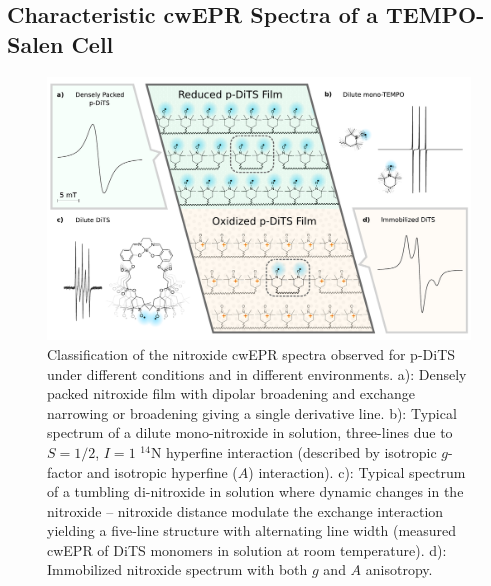 \subsection{Characteristic cwEPR Spectra of a TEMPO-Salen Cell}
\label{Classification}
\begin{figure}[H]
\center
	\includegraphics[width=1\textwidth]{./operando_epr/figures/Cartoon_ALL.pdf}
	\caption{Classification of the nitroxide cwEPR spectra observed for p-DiTS under different conditions and in different environments. a): Densely packed nitroxide film with dipolar broadening and exchange narrowing or broadening giving a single derivative line. b): Typical spectrum of a dilute mono-nitroxide in solution, three-lines due to $S=1/2$, $I=1$ $^{14}$N hyperfine interaction (described by isotropic $g$-factor and isotropic hyperfine ($A$) interaction). c): Typical spectrum of a tumbling di-nitroxide in solution where dynamic changes in the nitroxide -- nitroxide distance modulate the exchange interaction yielding a five-line structure with alternating line width (measured cwEPR of DiTS monomers in solution at room temperature). d): Immobilized nitroxide spectrum with both $g$ and $A$ anisotropy.}
	\label{fig:cartoon_spectra_dts}
\end{figure}


